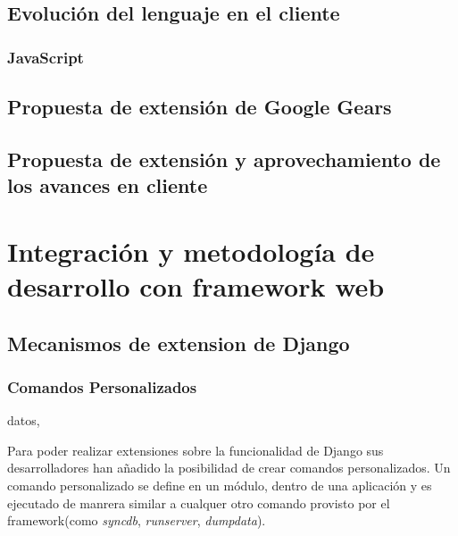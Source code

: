 \documentclass[a4paper]{report}
\begin{document}
\section{Evolución del lenguaje en el cliente}
\subsection{JavaScript}

\section{Propuesta de extensión de Google Gears}
\section{Propuesta de extensión y aprovechamiento de los avances en cliente}





\chapter{Integración y metodología de desarrollo con framework web}
\section{Mecanismos de extension de Django}

\subsection{Comandos Personalizados}


datos,

Para poder realizar extensiones sobre la funcionalidad de Django sus
desarrolladores han añadido la posibilidad de crear comandos
personalizados. Un comando personalizado se define en un módulo, dentro
de una aplicación y es ejecutado de manrera similar a cualquer 
otro comando provisto por el framework(como 
\emph{syncdb}, \emph{runserver}, \emph{dumpdata}).
\end{document}
